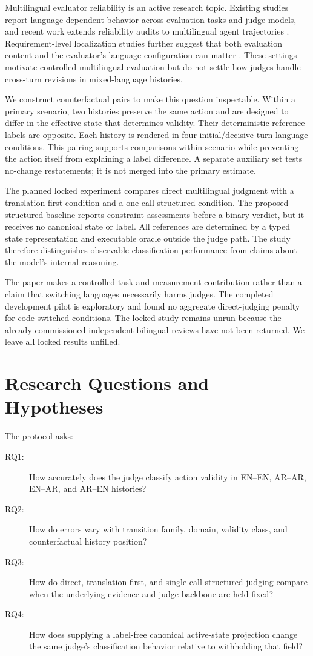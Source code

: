 \documentclass[11pt]{article}
\begin{document}
Multilingual evaluator reliability is an active research topic. Existing studies report language-dependent behavior across evaluation tasks and judge models, and recent work extends reliability audits to multilingual agent trajectories \citep{fu-liu-2025-multilingual-judge,kc-2026-babeljudge}. Requirement-level localization studies further suggest that both evaluation content and the evaluator's language configuration can matter \citep{mahmood-etal-2026-localization}. These settings motivate controlled multilingual evaluation but do not settle how judges handle cross-turn revisions in mixed-language histories.

We construct counterfactual pairs to make this question inspectable. Within a primary scenario, two histories preserve the same action and are designed to differ in the effective state that determines validity. Their deterministic reference labels are opposite. Each history is rendered in four initial/decisive-turn language conditions. This pairing supports comparisons within scenario while preventing the action itself from explaining a label difference. A separate auxiliary set tests no-change restatements; it is not merged into the primary estimate.

The planned locked experiment compares direct multilingual judgment with a translation-first condition and a one-call structured condition. The proposed structured baseline reports constraint assessments before a binary verdict, but it receives no canonical state or label. All references are determined by a typed state representation and executable oracle outside the judge path. The study therefore distinguishes observable classification performance from claims about the model's internal reasoning.

The paper makes a controlled task and measurement contribution rather than a claim that switching languages necessarily harms judges. The completed development pilot is exploratory and found no aggregate direct-judging penalty for code-switched conditions. The locked study remains unrun because the already-commissioned independent bilingual reviews have not been returned. We leave all locked results unfilled.

\section{Research Questions and Hypotheses}
The protocol asks:
\begin{description}
  \item[RQ1:] How accurately does the judge classify action validity in EN--EN, AR--AR, EN--AR, and AR--EN histories?
  \item[RQ2:] How do errors vary with transition family, domain, validity class, and counterfactual history position?
  \item[RQ3:] How do direct, translation-first, and single-call structured judging compare when the underlying evidence and judge backbone are held fixed?
  \item[RQ4:] How does supplying a label-free canonical active-state projection change the same judge's classification behavior relative to withholding that field?
\end{description}
\end{document}
